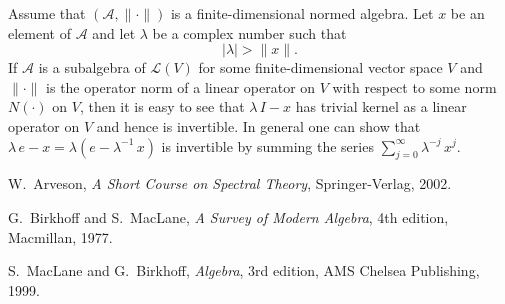 \documentclass[12pt,leqno,draft]{article}
\begin{document}
	Assume that $(\mathcal{A}, \|\cdot \|)$ is a
finite-dimensional normed algebra.  Let $x$ be an element of
$\mathcal{A}$ and let $\lambda$ be a complex number such that
\begin{equation}
	|\lambda| > \|x\|.
\end{equation}
If $\mathcal{A}$ is a subalgebra of $\mathcal{L}(V)$ for some
finite-dimensional vector space $V$ and $\|\cdot \|$ is the operator
norm of a linear operator on $V$ with respect to some norm $N(\cdot )$
on $V$, then it is easy to see that $\lambda \, I - x$ has trivial
kernel as a linear operator on $V$ and hence is invertible.  In
general one can show that $\lambda \, e - x = \lambda (e -
\lambda^{-1} \, x)$ is invertible by summing the series $\sum_{j =
0}^\infty \lambda^{-j} \, x^j$.

	



\begin{thebibliography}{3}


 W.~Arveson, {\it A Short Course on Spectral Theory},
Springer-Verlag, 2002.

 G.~Birkhoff and S.~MacLane, {\it A Survey of Modern Algebra},
4th edition, Macmillan, 1977.

 S.~MacLane and G.~Birkhoff, {\it Algebra}, 3rd edition,
AMS Chelsea Publishing, 1999.




\end{thebibliography}
\end{document}
